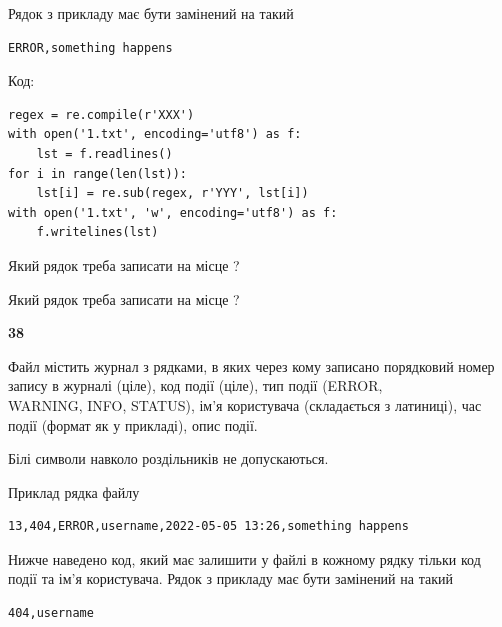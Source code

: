 Рядок з прикладу має бути замінений на такий



\begin{verbatim}
ERROR,something happens
\end{verbatim}




Код:



\begin{verbatim}
regex = re.compile(r'XXX')
with open('1.txt', encoding='utf8') as f:
    lst = f.readlines()
for i in range(len(lst)):
    lst[i] = re.sub(regex, r'YYY', lst[i])
with open('1.txt', 'w', encoding='utf8') as f:
    f.writelines(lst)
\end{verbatim}









Який рядок треба записати на місце  ?\par
\vspace{5mm}


Який рядок треба записати на місце  ?\par


\newpage

{\begin {center}\textbf{ 38}\end {center}}\par
Файл  містить журнал з рядками, в яких через кому записано поряд\-ко\-вий номер запису в журналі (ціле), код події (ціле), тип події (ERROR, \\WARNING, INFO, STATUS), ім'я користувача (складається з латиниці), час події (фор\-мат як у прикладі), опис події.

Білі символи навколо роздільників не допускаються.

Приклад рядка файлу



\begin{verbatim}
13,404,ERROR,username,2022-05-05 13:26,something happens
\end{verbatim}


Нижче наведено код, який має залишити у файлі в кожному рядку тільки код події та ім'я користувача. Рядок з прикладу має бути замінений на такий



\begin{verbatim}
404,username
\end{verbatim}




